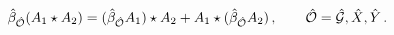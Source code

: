 \begin{equation}
\hat{\beta}_{\mathcal{\hat{O}}}(A_{1}\star A_{2})=(\hat{\beta}_{\mathcal{%
\hat{O}}}A_{1})\star A_{2}+A_{1}\star (\hat{\beta}_{\mathcal{\hat{O}}%
}A_{2})\,,\qquad \mathcal{\hat{O}}=\mathcal{\hat{G}},\hat{X},\hat{Y}\,.
\label{eq:su11derivation}
\end{equation}

